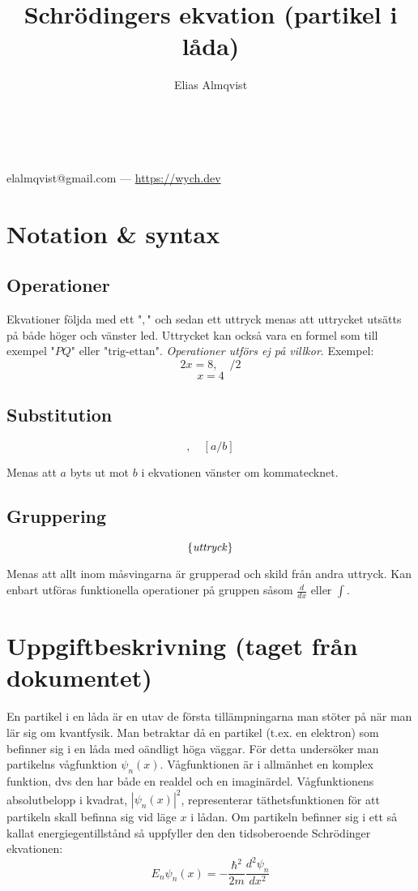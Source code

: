 \documentclass{article}
\makeatletter
\renewcommand{\maketitle}{
	\begin{center}
		{\huge\bfseries\thetitle}\\
		\vspace{1em}
		{\Large\theauthor} \\
		\vspace{1em}
		elalmqvist@gmail.com --- \url{https://wych.dev}
	\end{center}
}
\newcommand{\wavefun}{\psi_n(x)}
\newcommand{\shrodequ}{E_n \psi_n(x) = - \frac{\hbar^2}{2m} \frac{d^2 \psi_n}{dx^2}}
\newcommand{\shrodprob}{|\psi_n(x)|^2}
\makeatother
\begin{document}
\title{Schrödingers ekvation (partikel i låda)}
\author{Elias Almqvist}

\maketitle
\newpage

\section{Notation \& syntax}
\subsection{Operationer}
Ekvationer följda med ett "$,$" och sedan ett uttryck menas att uttrycket utsätts på både höger och vänster led. Uttrycket kan också vara en formel som till exempel "$PQ$" eller "$\text{trig-ettan}$". \emph{Operationer utförs ej på villkor}. Exempel:
$$
2x = 8, \quad /2
$$
$$
x = 4
$$

\subsection{Substitution}
$$
, \quad \left[ a / b \right]
$$

Menas att $a$ byts ut mot $b$ i ekvationen vänster om kommatecknet.

\subsection{Gruppering}
$$
\left\{\text{\emph{uttryck}}\right\}
$$

Menas att allt inom måsvingarna är grupperad och skild från andra uttryck. Kan enbart utföras funktionella operationer på gruppen såsom $\frac{d}{dx}$ eller $\int$.

\newpage
\section{Uppgiftbeskrivning (taget från dokumentet)}
En partikel i en låda är en utav de första tillämpningarna man stöter på när man lär sig om kvantfysik. Man betraktar då en partikel (t.ex. en elektron) som befinner sig i en låda med oändligt höga väggar.
För detta undersöker man partikelns vågfunktion $\wavefun$. Vågfunktionen är i allmänhet en komplex funktion,
dvs den har både en realdel och en imaginärdel. Vågfunktionens absolutbelopp i kvadrat, $\shrodprob$, representerar täthetsfunktionen för att partikeln skall befinna sig vid läge $x$ i lådan. Om partikeln befinner sig i ett så
kallat energiegentillstånd så uppfyller den den tidsoberoende Schrödinger ekvationen:
\begin{equation} \label{shrodequ}
	\shrodequ
\end{equation}
\end{document}
